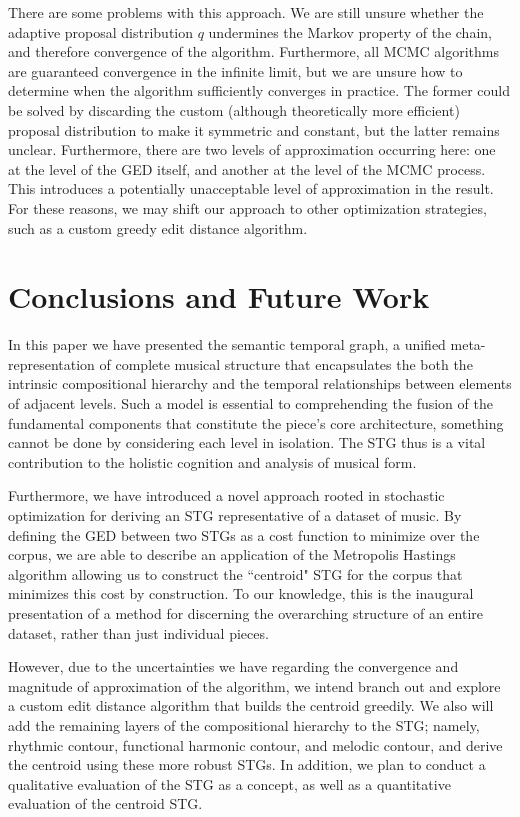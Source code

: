 \documentclass{article}
\begin{document}
There are some problems with this approach.  We are still unsure whether the adaptive proposal distribution $q$ undermines the Markov property of the chain, and therefore convergence of the algorithm. Furthermore, all MCMC algorithms are guaranteed convergence in the infinite limit, but we are unsure how to determine when the algorithm sufficiently converges in practice. The former could be solved by discarding the custom (although theoretically more efficient) proposal distribution to make it symmetric and constant, but the latter remains unclear. Furthermore, there are two levels of approximation occurring here: one at the level of the GED itself, and another at the level of the MCMC process. This introduces a potentially unacceptable level of approximation in the result. For these reasons, we may shift our approach to other optimization strategies, such as a custom greedy edit distance algorithm. 
 

\section{Conclusions and Future Work}
In this paper we have presented the semantic temporal graph, a unified meta-representation of complete musical structure that encapsulates the both the intrinsic compositional hierarchy and the temporal relationships between elements of adjacent levels. Such a model is essential to comprehending the fusion of the fundamental components that constitute the piece's core architecture, something cannot be done by considering each level in isolation. The STG thus is a vital contribution to the holistic cognition and analysis of musical form. 

Furthermore, we have introduced a novel approach rooted in stochastic optimization for deriving an STG representative of a dataset of music. By defining the GED between two STGs as a cost function to minimize over the corpus, we are able to describe an application of the Metropolis Hastings algorithm allowing us to construct the ``centroid" STG for the corpus that minimizes this cost by construction. To our knowledge, this is the inaugural presentation of a method for discerning the overarching structure of an entire dataset, rather than just individual pieces.

However, due to the uncertainties we have regarding the convergence and magnitude of approximation of the algorithm, we intend branch out and explore a custom edit distance algorithm that builds the centroid greedily. We also will add the remaining layers of the compositional hierarchy to the STG; namely, rhythmic contour, functional harmonic contour, and melodic contour, and derive the centroid using these more robust STGs. In addition, we plan to conduct a qualitative evaluation of the STG as a concept, as well as a quantitative evaluation of the centroid STG. 
\end{document}
